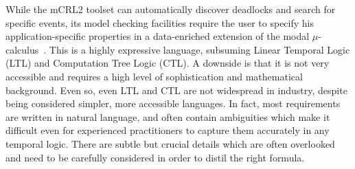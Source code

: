 \documentclass[letter]{llncs}
\newcommand{\figshrink}{\vspace{-.6cm}}
\newcommand{\figshrinkend}{}
\begin{document}

While the mCRL2 toolset can automatically discover deadlocks and search
for specific events, its model checking facilities require the user to
specify his application-specific properties in a data-enriched extension
of the modal $\mu$-calculus~\cite{Groote05model-checkingprocesses}. 
This is a highly expressive language, subsuming Linear Temporal Logic
(LTL) and Computation Tree Logic (CTL). A downside is that
it is not very accessible and
requires a high level of sophistication and mathematical background.
Even so, even LTL and CTL are not widespread in industry, despite being
considered simpler, more accessible languages. In fact, most requirements
are written in natural language, and often contain ambiguities which
make it difficult even for experienced practitioners to capture them
accurately in any temporal logic. There are subtle but crucial details
which are often overlooked and need to be carefully considered in order
to distil the right formula.




\end{document}
